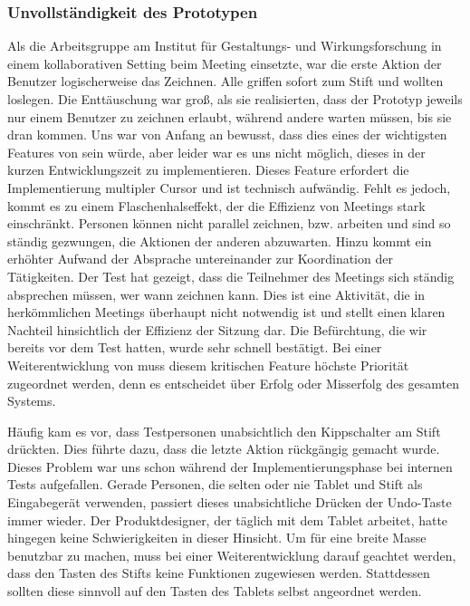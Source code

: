 \subsubsection{Unvollständigkeit des Prototypen}
Als die Arbeitsgruppe am Institut für Gestaltungs- und Wirkungsforschung \scribbler in einem kollaborativen Setting beim Meeting einsetzte, war die erste Aktion der Benutzer logischerweise das Zeichnen. Alle griffen sofort zum Stift und wollten loslegen. Die Enttäuschung war groß, als sie realisierten, dass der Prototyp jeweils nur einem Benutzer zu zeichnen erlaubt, während andere warten müssen, bis sie dran kommen. Uns war von Anfang an bewusst, dass dies eines der wichtigsten Features von \scribbler sein würde, aber leider war es uns nicht möglich, dieses in der kurzen Entwicklungszeit zu implementieren. Dieses Feature erfordert die Implementierung multipler Cursor und ist technisch aufwändig. Fehlt es jedoch, kommt es zu einem Flaschenhalseffekt, der die Effizienz von Meetings stark einschränkt. Personen können nicht parallel zeichnen, bzw. arbeiten und sind so ständig gezwungen, die Aktionen der anderen abzuwarten. Hinzu kommt ein erhöhter Aufwand der Absprache untereinander zur Koordination der Tätigkeiten. Der Test hat gezeigt, dass die Teilnehmer des Meetings sich ständig absprechen müssen, wer wann zeichnen kann. Dies ist eine Aktivität, die in herkömmlichen Meetings überhaupt nicht notwendig ist und stellt einen klaren Nachteil hinsichtlich der Effizienz der Sitzung dar. Die Befürchtung, die wir bereits vor dem Test hatten, wurde sehr schnell bestätigt. Bei einer Weiterentwicklung von \scribbler muss diesem kritischen Feature höchste Priorität zugeordnet werden, denn es entscheidet über Erfolg oder Misserfolg des gesamten Systems.

\medskip Häufig kam es vor, dass Testpersonen unabsichtlich den Kippschalter am Stift drückten. Dies führte dazu, dass die letzte Aktion rückgängig gemacht wurde. Dieses Problem war uns schon während der Implementierungsphase bei internen Tests aufgefallen. Gerade Personen, die selten oder nie Tablet und Stift als Eingabegerät verwenden, passiert dieses unabsichtliche Drücken der Undo-Taste immer wieder. Der Produktdesigner, der täglich mit dem Tablet arbeitet, hatte hingegen keine Schwierigkeiten in dieser Hinsicht. Um \scribbler für eine breite Masse benutzbar zu machen, muss bei einer Weiterentwicklung darauf geachtet werden, dass den Tasten des Stifts keine Funktionen zugewiesen werden. Stattdessen sollten diese sinnvoll auf den Tasten des Tablets selbst angeordnet werden.

